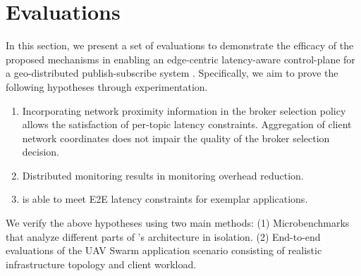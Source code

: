 \section{Evaluations}
In this section, we present a set of evaluations to demonstrate the efficacy of the proposed mechanisms in enabling an edge-centric latency-aware control-plane for a geo-distributed publish-subscribe system \epulsar{}. Specifically, we aim to prove the following hypotheses through experimentation.
\begin{enumerate}
\item Incorporating network proximity information in the broker selection policy allows the satisfaction of per-topic latency constraints. Aggregation of client network coordinates does not impair the quality of the broker selection decision.
\item Distributed monitoring results in monitoring overhead reduction.
\item \epulsar{} is able to meet E2E latency %
constraints for exemplar applications.
\end{enumerate}
We verify the above hypotheses using two main methods: (1) Microbenchmarks that analyze different parts of \epulsar's architecture in isolation. (2) End-to-end evaluations of the UAV Swarm application scenario consisting of realistic infrastructure topology and client workload.

